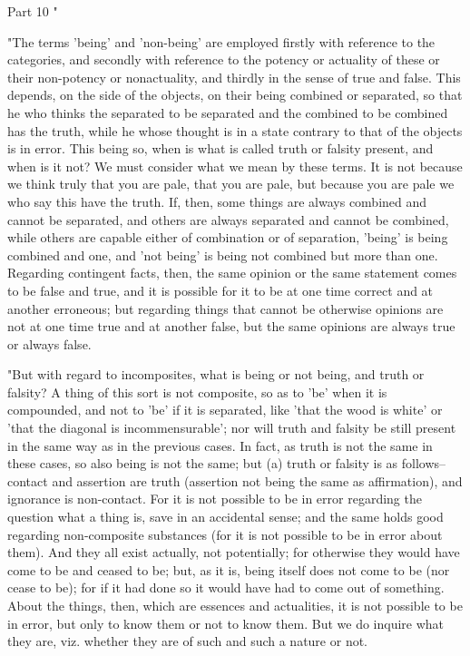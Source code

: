 Part 10 "

"The terms 'being' and 'non-being' are employed firstly with reference
to the categories, and secondly with reference to the potency or actuality
of these or their non-potency or nonactuality, and thirdly in the
sense of true and false. This depends, on the side of the objects,
on their being combined or separated, so that he who thinks the separated
to be separated and the combined to be combined has the truth, while
he whose thought is in a state contrary to that of the objects is
in error. This being so, when is what is called truth or falsity present,
and when is it not? We must consider what we mean by these terms.
It is not because we think truly that you are pale, that you are pale,
but because you are pale we who say this have the truth. If, then,
some things are always combined and cannot be separated, and others
are always separated and cannot be combined, while others are capable
either of combination or of separation, 'being' is being combined
and one, and 'not being' is being not combined but more than one.
Regarding contingent facts, then, the same opinion or the same statement
comes to be false and true, and it is possible for it to be at one
time correct and at another erroneous; but regarding things that cannot
be otherwise opinions are not at one time true and at another false,
but the same opinions are always true or always false. 

"But with regard to incomposites, what is being or not being, and
truth or falsity? A thing of this sort is not composite, so as to
'be' when it is compounded, and not to 'be' if it is separated, like
'that the wood is white' or 'that the diagonal is incommensurable';
nor will truth and falsity be still present in the same way as in
the previous cases. In fact, as truth is not the same in these cases,
so also being is not the same; but (a) truth or falsity is as follows--contact
and assertion are truth (assertion not being the same as affirmation),
and ignorance is non-contact. For it is not possible to be in error
regarding the question what a thing is, save in an accidental sense;
and the same holds good regarding non-composite substances (for it
is not possible to be in error about them). And they all exist actually,
not potentially; for otherwise they would have come to be and ceased
to be; but, as it is, being itself does not come to be (nor cease
to be); for if it had done so it would have had to come out of something.
About the things, then, which are essences and actualities, it is
not possible to be in error, but only to know them or not to know
them. But we do inquire what they are, viz. whether they are of such
and such a nature or not. 

